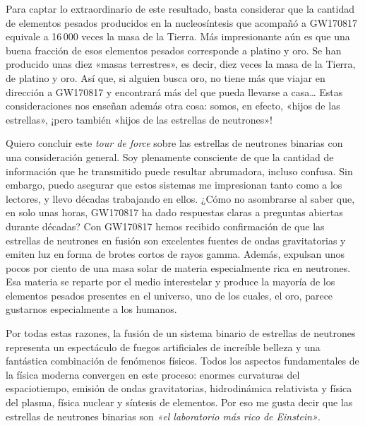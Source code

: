 Para captar lo extraordinario de este resultado, basta considerar que la cantidad de elementos pesados producidos en la nucleosíntesis que acompañó a GW170817 equivale a 16\,000 veces la masa de la Tierra. Más impresionante aún es que una buena fracción de esos elementos pesados corresponde a platino y oro. Se han producido unas diez «masas terrestres», es decir, diez veces la masa de la Tierra, de platino y oro. Así que, si alguien busca oro, no tiene más que viajar en dirección a GW170817 y encontrará más del que pueda llevarse a casa\ldots{} Estas consideraciones nos enseñan además otra cosa: somos, en efecto, «hijos de las estrellas», ¡pero también «hijos de las estrellas de neutrones»!

Quiero concluir este \emph{tour de force} sobre las estrellas de neutrones binarias con una consideración general. Soy plenamente consciente de que la cantidad de información que he transmitido puede resultar abrumadora, incluso confusa. Sin embargo, puedo asegurar que estos sistemas me impresionan tanto como a los lectores, y llevo décadas trabajando en ellos. ¿Cómo no asombrarse al saber que, en solo unas horas, GW170817 ha dado respuestas claras a preguntas abiertas durante décadas? Con GW170817 hemos recibido confirmación de que las estrellas de neutrones en fusión son excelentes fuentes de ondas gravitatorias y emiten luz en forma de brotes cortos de rayos gamma. Además, expulsan unos pocos por ciento de una masa solar de materia especialmente rica en neutrones. Esa materia se reparte por el medio interestelar y produce la mayoría de los elementos pesados presentes en el universo, uno de los cuales, el oro, parece gustarnos especialmente a los humanos.

Por todas estas razones, la fusión de un sistema binario de estrellas de neutrones representa un espectáculo de fuegos artificiales de increíble belleza y una fantástica combinación de fenómenos físicos. Todos los aspectos fundamentales de la física moderna convergen en este proceso: enormes curvaturas del espaciotiempo, emisión de ondas gravitatorias, hidrodinámica relativista y física del plasma, física nuclear y síntesis de elementos. Por eso me gusta decir que las estrellas de neutrones binarias son \emph{«el laboratorio más rico de Einstein»}.

